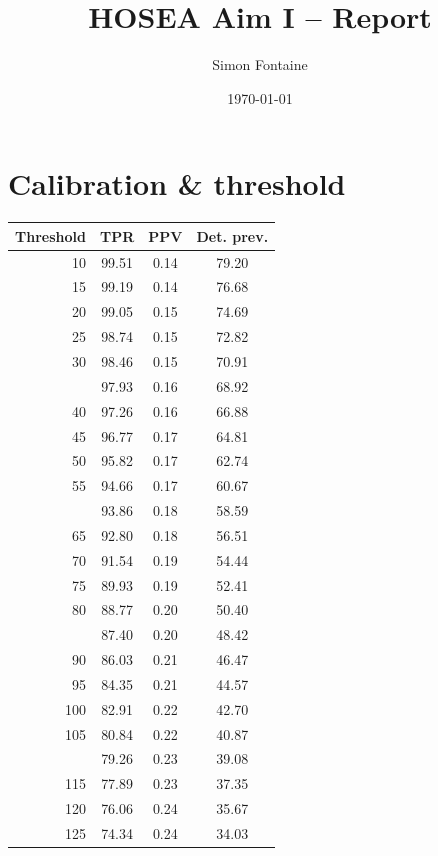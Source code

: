 \documentclass[12pt]{article}
\title{HOSEA Aim I -- Report}
\author{Simon Fontaine}
\date{\today}
\begin{document}
\maketitle

\clearpage
\newpage
\section*{Calibration \& threshold}


\begin{minipage}{0.5\textwidth}\small
\begin{tabular}{rccc}
\toprule
\textbf{Threshold} & \textbf{TPR} 
& \textbf{PPV} & \textbf{Det. prev.} \\
\midrule

    10 & 99.51 & 0.14 & 79.20 \\ 
    15 & 99.19 & 0.14 & 76.68 \\ 
    20 & 99.05 & 0.15 & 74.69 \\ 
    25 & 98.74 & 0.15 & 72.82 \\ 
    30 & 98.46 & 0.15 & 70.91 \\ \addlinespace
    35 & 97.93 & 0.16 & 68.92 \\ 
    40 & 97.26 & 0.16 & 66.88 \\ 
    45 & 96.77 & 0.17 & 64.81 \\ 
    50 & 95.82 & 0.17 & 62.74 \\ 
    55 & 94.66 & 0.17 & 60.67 \\ \addlinespace 
    60 & 93.86 & 0.18 & 58.59 \\ 
    65 & 92.80 & 0.18 & 56.51 \\ 
    70 & 91.54 & 0.19 & 54.44 \\ 
    75 & 89.93 & 0.19 & 52.41 \\ 
    80 & 88.77 & 0.20 & 50.40 \\  \addlinespace
    85 & 87.40 & 0.20 & 48.42 \\ 
    90 & 86.03 & 0.21 & 46.47 \\ 
    95 & 84.35 & 0.21 & 44.57 \\ 
   100 & 82.91 & 0.22 & 42.70 \\ 
   105 & 80.84 & 0.22 & 40.87 \\  \addlinespace
   110 & 79.26 & 0.23 & 39.08 \\ 
   115 & 77.89 & 0.23 & 37.35 \\ 
   120 & 76.06 & 0.24 & 35.67 \\ 
   125 & 74.34 & 0.24 & 34.03 \\ 

\end{tabular}
\end{minipage}
\end{document}
